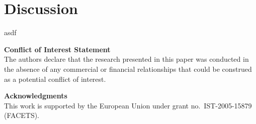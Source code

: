 \documentclass[10pt,a4paper]{scrartcl}
\begin{document}


\clearpage
\section{\large Discussion} 

asdf
\vspace{15pt}


{\bf \large \noindent Conflict of Interest Statement}\\

\noindent The authors declare that the research presented in this paper was conducted in the absence of any commercial or financial relationships that could be construed as a potential conflict of interest.\\
\vspace{15pt}

{\bf \large \noindent Acknowledgments}\\

\noindent This work is supported by the European Union under grant no.\ IST-2005-15879 (FACETS).\\
\vspace{15pt}




\renewcommand\refname{\subsubsection*{References}}
\small{
    
}
\end{document}
